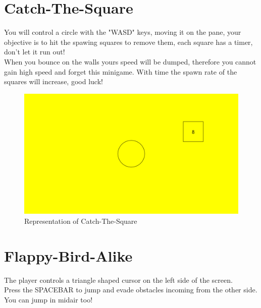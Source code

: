 \documentclass[a4paper,12pt]{report}
\begin{document}
\section*{Catch-The-Square}
You will control a circle with the "WASD" keys, moving it on the pane, your objective is to hit the spawing squares to remove them, each square has a timer, don't let it run out!\\
When you bounce on the walls yours speed will be dumped, therefore you cannot gain high speed and forget this minigame.
With time the spawn rate of the squares will increase, good luck!
\begin{figure}[H]
	\centering{}
	\includegraphics[width=330pt]{res/Cts.PNG}
	\caption{Representation of Catch-The-Square}
\end{figure}
\section*{Flappy-Bird-Alike}
The player controls a triangle shaped cursor on the left side of the screen.\\
Press the SPACEBAR to jump and evade obstacles incoming from the other side. You can jump in midair too!
\end{document}
